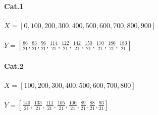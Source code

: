 \paragraph{Cat.1}
$X=[0,100,200,300,400,500,600,700,800,900]$ \\ \\
$Y=[\frac{86}{21},\frac{83}{21},\frac{96}{21},\frac{114}{21},\frac{122}{21},\frac{142}{21},\frac{150}{21},\frac{170}{21},\frac{180}{21},\frac{183}{21}]$\\
\paragraph{Cat.2}\par
$X=[100,200,300,400,500,600,700,800]$ \\ \\
$Y=[\frac{140}{21},\frac{133}{21},\frac{111}{21},\frac{105}{21},\frac{100}{21},\frac{89}{21},\frac{88}{21},\frac{93}{21}]$\\
